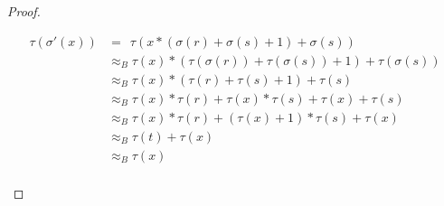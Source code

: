 \begin{proof}
\begin{itemize}
\begin{align*}
		\tau(\sigma'(x))&=\ \ \tau(x*(\sigma(r)+\sigma(s)+1)+\sigma(s))\\
		&\approx_B \tau(x)*(\tau(\sigma(r))+\tau(\sigma(s))+1)+\tau(\sigma(s))\\
		&\approx_B \tau(x)*(\tau(r)+\tau(s)+1)+\tau(s)\\
		&\approx_B \tau(x)*\tau(r)+\tau(x)*\tau(s)+\tau(x)+\tau(s)\\
		&\approx_B \tau(x)*\tau(r)+(\tau(x)+1)*\tau(s)+\tau(x)\\
		&\approx_B \tau(t)+\tau(x)\\
		&\approx_B \tau(x)\\
		\end{align*}
		\end{itemize}
		\end{proof}
